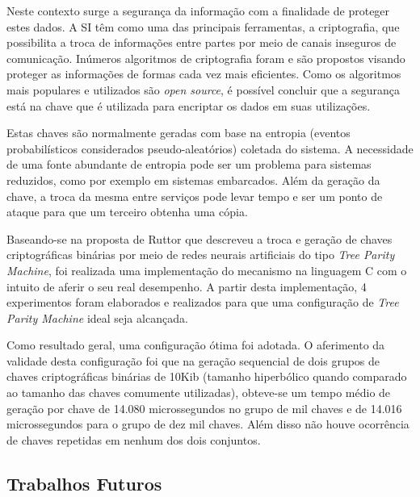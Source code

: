 \documentclass[12pt]{article}
\begin{document}
        Neste contexto surge a segurança da informação com a finalidade de proteger estes dados. A SI têm como uma das principais ferramentas, a criptografia, que possibilita a troca de informações entre partes por meio de canais inseguros de comunicação. Inúmeros algoritmos de criptografia foram e são propostos visando proteger as informações de formas cada vez mais eficientes. Como os algoritmos mais populares e utilizados são \textit{open source}, é possível concluir que a segurança está na chave que é utilizada para encriptar os dados em suas utilizações.

        Estas chaves são normalmente geradas com base na entropia (eventos probabilísticos considerados pseudo-aleatórios) coletada do sistema. A necessidade de uma fonte abundante de entropia pode ser um problema para sistemas reduzidos, como por exemplo em sistemas embarcados. Além da geração da chave, a troca da mesma entre serviços pode levar tempo e ser um ponto de ataque para que um terceiro obtenha uma cópia.
        
        Baseando-se na proposta de Ruttor \cite{ruttor2007neural} que descreveu a troca e geração de chaves criptográficas binárias por meio de redes neurais artificiais do tipo \textit{Tree Parity Machine}, foi realizada uma implementação do mecanismo na linguagem C com o intuito de aferir o seu real desempenho. A partir desta implementação, 4 experimentos foram elaborados e realizados para que uma configuração de \textit{Tree Parity Machine} ideal seja alcançada.
        
        Como resultado geral, uma configuração ótima foi adotada. O aferimento da validade desta configuração foi que na geração sequencial de dois grupos de chaves criptográficas binárias de 10Kib (tamanho hiperbólico quando comparado ao tamanho das chaves comumente utilizadas), obteve-se um tempo médio de geração por chave de 14.080 microssegundos no grupo de mil chaves e de 14.016 microssegundos para o grupo de dez mil chaves. Além disso não houve ocorrência de chaves repetidas em nenhum dos dois conjuntos.
        

        \subsection{Trabalhos Futuros}
        \label{subsec:trabalhosFuturos}
        
\end{document}
